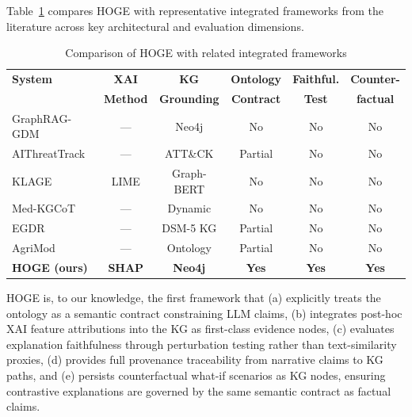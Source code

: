 \documentclass[lnbip]{svmultln}
\begin{document}
Table~\ref{tab:comparison} compares HOGE with representative integrated frameworks from the literature across key architectural and evaluation dimensions.

\begin{table}[htp]
    \centering
    \caption{Comparison of HOGE with related integrated frameworks}
    \label{tab:comparison}
    \begin{tabular}{l c c c c c}
        \toprule
        \textbf{System} & \textbf{XAI} & \textbf{KG} & \textbf{Ontology} & \textbf{Faithful.} & \textbf{Counter-} \\
        & \textbf{Method} & \textbf{Grounding} & \textbf{Contract} & \textbf{Test} & \textbf{factual} \\
        \midrule
        GraphRAG-GDM~\cite{gdm2026} & --- & Neo4j & No & No & No \\
        AIThreatTrack~\cite{threat2025} & --- & ATT\&CK & Partial & No & No \\
        KLAGE~\cite{klage2026} & LIME & Graph-BERT & No & No & No \\
        Med-KGCoT~\cite{medkgcot2025} & --- & Dynamic & No & No & No \\
        EGDR~\cite{depress2025} & --- & DSM-5 KG & Partial & No & No \\
        AgriMod~\cite{soil2025} & --- & Ontology & Partial & No & No \\
        \textbf{HOGE (ours)} & \textbf{SHAP} & \textbf{Neo4j} & \textbf{Yes} & \textbf{Yes} & \textbf{Yes} \\
        \bottomrule
    \end{tabular}
\end{table}

HOGE is, to our knowledge, the first framework that (a) explicitly treats the ontology as a semantic contract constraining LLM claims, (b) integrates post-hoc XAI feature attributions into the KG as first-class evidence nodes, (c) evaluates explanation faithfulness through perturbation testing rather than text-similarity proxies, (d) provides full provenance traceability from narrative claims to KG paths, and (e) persists counterfactual what-if scenarios as KG nodes, ensuring contrastive explanations are governed by the same semantic contract as factual claims.
\end{document}
